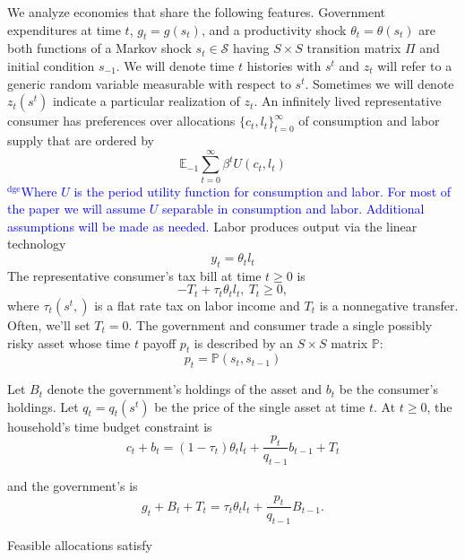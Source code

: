 \documentclass[12pt]{article}
\newcommand{\dge}[1]{\textcolor{blue}{$^{\textrm{dge}}${#1}}}
\begin{document}
We analyze economies that share the following features.
Government expenditures at time $t$, $g_t=g(s_t)$, and a productivity shock $\theta_t=\theta(s_t)$ are both functions of
  a Markov  shock $s_t\in \mathcal{S}$ having  $S \times S$ transition matrix $\Pi$ and initial condition $s_{-1}$. We will denote time $t$ histories with $s^t$ and $z_t$ will refer to a generic random variable measurable with respect to $s^t$. Sometimes we will denote $z_t(s^t)$ indicate a particular realization of $z_t$.
 An infinitely lived representative consumer has preferences over allocations  $\{c_t, l_t\}_{t=0}^\infty$ of consumption and labor supply that are ordered
by
   \begin{equation}
   \label{eqn:obj}
\mathbb{E}_{-1}\sum_{t=0}^{\infty } \beta^t  U\left(
c_t,l_t\right)
\end{equation}%
\dge{Where $U$ is the period utility function for consumption and labor.  For most of the paper we will assume $U$ separable in consumption and labor.  Additional assumptions will be made as needed.}  Labor produces output via the linear technology
  \begin{equation*}
  y_t=\theta_{t} l_{t} \end{equation*}
The representative consumer's tax bill
 at time $t \geq 0$ is
 \[- T_t + \tau_t \theta_{t}l_{t},  \ T_t \geq 0, \]
 where $\tau_t(s^t,)$ is a flat rate tax on labor income and $T_t$ is a nonnegative transfer.
 Often, we'll set $T_t =0$.
The government and consumer trade a single  possibly risky  asset whose  time $t$ payoff $p_t$ is described by an $S \times S$ matrix $\mathbb{P}$:
\[p_t=\mathbb{P}(s_{t},s_{t-1}) \]

Let $B_t$ denote the government's holdings of the asset and $b_t$ be the consumer's holdings.
Let $q_t= q_t(s^t)$ be the price of the single  asset at time $t$.
 At $t \geq 0$, the household's time budget constraint is
 \begin{equation}
 \label{eqn:HHbudget}
 c_{t}+b_{t}=\left( 1-\tau _{t}\right) \theta _{t}l_{t}+\frac{p_{t}}{q_{t-1}}b_{t-1}+T_{t}
 \end{equation}

 and the government's is
 \begin{equation}
 \label{eqn:Govbudget}
g_{t}+B_{t}+T_t=\tau _{t}\theta_{t}l_{t}+\frac{p_{t}}{q_{t-1}}B_{t-1}.
 \end{equation}


Feasible allocations satisfy
\end{document}
